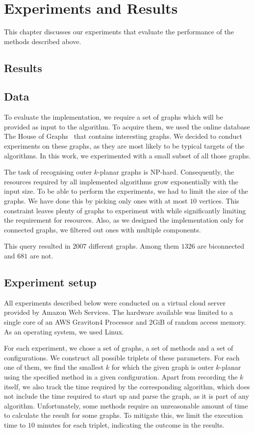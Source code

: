 \chapter{Experiments and Results}

This chapter discusses our experiments that evaluate the performance of the methods described above.

\section{Results}

\section{Data}

To evaluate the implementation, we require a set of graphs which will be provided as input to the algorithm. To acquire them, we used the online database The House of Graphs~\cite{HoG} that contains interesting graphs. We decided to conduct experiments on these graphs, as they are most likely to be typical targets of the algorithms. In this work, we experimented with a small subset of all those graphs.

The task of recognising outer \(k\)-planar graphs is NP-hard. Consequently, the resources required by all implemented algorithms grow exponentially with the input size. To be able to perform the experiments, we had to limit the size of the graphs. We have done this by picking only ones with at most \(10\) vertices. This constraint leaves plenty of graphs to experiment with while significantly limiting the requirement for resources. Also, as we designed the implementation only for connected graphs, we filtered out ones with multiple components.

This query resulted in \(2007\) different graphs. Among them \(1326\) are biconnected and \(681\) are not.


\section{Experiment setup}

All experiments described below were conducted on a virtual cloud server provided by Amazon Web Services. The hardware available was limited to a single core of an AWS Graviton4 Processor and 2GiB of random access memory. As an operating system, we used Linux.

For each experiment, we chose a set of graphs, a set of methods and a set of configurations. We construct all possible triplets of these parameters. For each one of them, we find the smallest \(k\) for which the given graph is outer \(k\)-planar using the specified method in a given configuration. Apart from recording the \(k\) itself, we also track the time required by the corresponding algorithm, which does not include the time required to start up and parse the graph, as it is part of any algorithm. Unfortunately, some methods require an unreasonable amount of time to calculate the result for some graphs. To mitigate this, we limit the execution time to \(10\) minutes for each triplet, indicating the outcome in the results.

